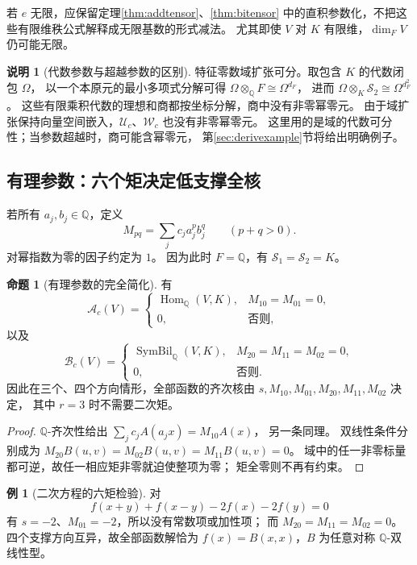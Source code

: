 \documentclass[UTF8,11pt,a4paper]{ctexart}
\theoremstyle{definition}
\newtheorem{proposition}[theorem]{命题}
\newtheorem{example}[theorem]{例}
\newtheorem{remark}[theorem]{说明}
\newcommand{\Q}{\mathbb Q}
\newcommand{\Hom}{\operatorname{Hom}}
\newcommand{\Uc}{\mathscr U_c}
\newcommand{\Wc}{\mathscr W_c}
\numberwithin{equation}{section}
\begin{document}
若 $e$ 无限，应保留定理\ref{thm:addtensor}、\ref{thm:bitensor}
中的直积参数化，不把这些有限维秩公式解释成无限基数的形式减法。
尤其即使 $V$ 对 $K$ 有限维，$\dim_FV$ 仍可能无限。

\begin{remark}[代数参数与超越参数的区别]
特征零数域扩张可分。取包含 $K$ 的代数闭包 $\Omega$，
以一个本原元的最小多项式分解可得
$\Omega\otimes_{\Q}F\cong\Omega^{d_F}$，
进而 $\Omega\otimes_K\mathscr S_2\cong\Omega^{d_F^2}$。
这些有限乘积代数的理想和商都按坐标分解，商中没有非零幂零元。
由于域扩张保持向量空间嵌入，$\Uc$、$\Wc$ 也没有非零幂零元。
这里用的是域的代数可分性；当参数超越时，商可能含幂零元，
第\ref{sec:derivexample}节将给出明确例子。
\end{remark}

\subsection{有理参数：六个矩决定低支撑全核}
若所有 $a_j,b_j\in\Q$，定义
\[
 M_{pq}=\sum_jc_j a_j^p b_j^q\qquad(p+q>0).
\]
对幂指数为零的因子约定为 $1$。
因为此时 $F=\Q$，有 $\mathscr S_1=\mathscr S_2=K$。

\begin{proposition}[有理参数的完全简化]\label{prop:rationalmoments}
有
\[
 \mathcal A_c(V)=
 \begin{cases}
 \Hom_{\Q}(V,K),&M_{10}=M_{01}=0,\\
 0,&\text{否则},
 \end{cases}
\]
以及
\[
 \mathcal B_c(V)=
 \begin{cases}
 \operatorname{SymBil}_{\Q}(V,K),
   &M_{20}=M_{11}=M_{02}=0,\\
 0,&\text{否则}.
 \end{cases}
\]
因此在三个、四个方向情形，全部函数的齐次核由
$s,M_{10},M_{01},M_{20},M_{11},M_{02}$ 决定，
其中 $r=3$ 时不需要二次矩。
\end{proposition}
\begin{proof}
$\Q$-齐次性给出
$\sum_jc_jA(a_jx)=M_{10}A(x)$，
另一条同理。
双线性条件分别成为
$M_{20}B(u,v)=M_{02}B(u,v)=M_{11}B(u,v)=0$。
域中的任一非零标量都可逆，故任一相应矩非零就迫使整项为零；
矩全零则不再有约束。
\end{proof}

\begin{example}[二次方程的六矩检验]
对
\[
 f(x+y)+f(x-y)-2f(x)-2f(y)=0
\]
有 $s=-2$、$M_{01}=-2$，所以没有常数项或加性项；
而
$M_{20}=M_{11}=M_{02}=0$。
四个支撑方向互异，故全部函数解恰为
$f(x)=B(x,x)$，$B$ 为任意对称 $\Q$-双线性型。
\end{example}
\end{document}
